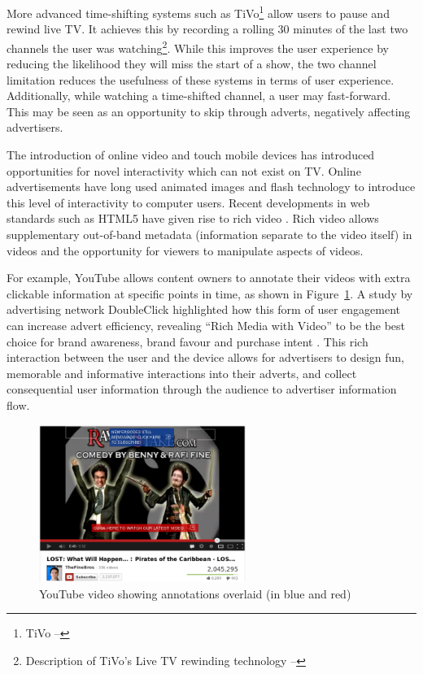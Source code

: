 	More advanced time-shifting systems such as TiVo\footnote{TiVo -- } allow users to pause and rewind live TV. It achieves this by recording a rolling 30 minutes of the last two channels the user was watching\footnote{Description of TiVo's Live TV rewinding technology -- }. While this improves the user experience by reducing the likelihood they will miss the start of a show, the two channel limitation reduces the usefulness of these systems in terms of user experience. Additionally, while watching a time-shifted channel, a user may fast-forward. This may be seen as an opportunity to skip through adverts, negatively affecting advertisers.

	The introduction of online video and touch mobile devices has introduced opportunities for novel interactivity which can not exist on TV. Online advertisements have long used animated images and flash technology to introduce this level of interactivity to computer users. Recent developments in web standards such as HTML5 have given rise to rich video \citep{HLS}. Rich video allows supplementary out-of-band metadata (information separate to the video itself) in videos and the opportunity for viewers to manipulate aspects of videos. 

	For example, YouTube allows content owners to annotate their videos with extra clickable information at specific points in time, as shown in Figure~\ref{fig:youtube_annotation}. A study by advertising network DoubleClick highlighted how this form of user engagement can increase advert efficiency, revealing ``Rich Media with Video'' to be the best choice for brand awareness, brand favour and purchase intent \citep{rich-video}. This rich interaction between the user and the device allows for advertisers to design fun, memorable and informative interactions into their adverts, and collect consequential user information through the audience to advertiser information flow.

	\begin{figure}[htb]
		\centering
			\includegraphics[width=0.6\textwidth]{images/youtube_annotations.png}
		\caption{YouTube video showing annotations overlaid (in blue and red)}
		\label{fig:youtube_annotation}
	\end{figure}


